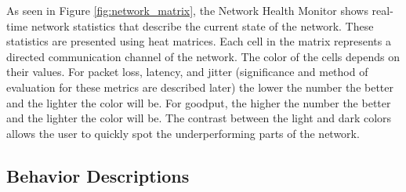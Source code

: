 \documentclass[letterpaper,twocolumn,12pt]{article}
\begin{document}

As seen in Figure \ref{fig:network_matrix}, the Network Health Monitor shows real-time network statistics that describe the current state of the network. These statistics are presented using heat matrices. Each cell in the matrix represents a directed communication channel of the network. The color of the cells depends on their values. For packet loss, latency, and jitter (significance and method of evaluation for these metrics are described later) the lower the number the better and the lighter the color will be. For goodput, the higher the number the better and the lighter the color will be. The contrast between the light and dark colors allows the user to quickly spot the underperforming parts of the network.

\subsection{Behavior Descriptions}
\end{document}
